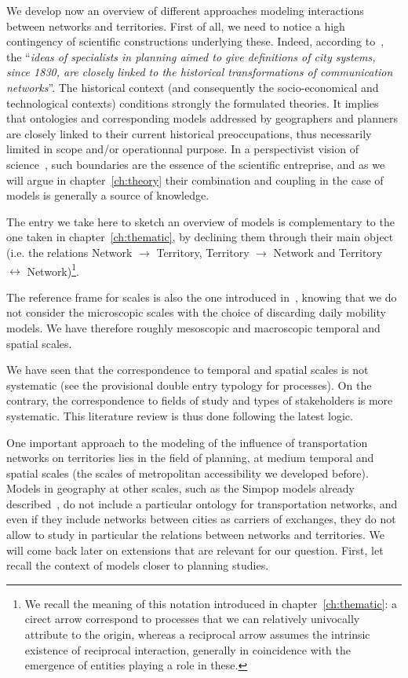 \documentclass[galley]{jtlu-article-2col}
\begin{document}
We develop now an overview of different approaches modeling interactions between networks and territories. First of all, we need to notice a high contingency of scientific constructions underlying these. Indeed, according to~\cite{bretagnolle2002time}, the ``\textit{ideas of specialists in planning aimed to give definitions of city systems, since 1830, are closely linked to the historical transformations of communication networks}''. The historical context (and consequently the socio-economical and technological contexts) conditions strongly the formulated theories. It implies that ontologies and corresponding models addressed by geographers and planners are closely linked to their current historical preoccupations, thus necessarily limited in scope and/or operationnal purpose. In a perspectivist vision of science~\cite{giere2010scientific}, such boundaries are the essence of the scientific entreprise, and as we will argue in chapter~\ref{ch:theory} their combination and coupling in the case of models is generally a source of knowledge.

The entry we take here to sketch an overview of models is complementary to the one taken in chapter~\ref{ch:thematic}, by declining them through their main object (i.e. the relations Network $\rightarrow$ Territory, Territory $\rightarrow$ Network and Territory $\leftrightarrow$ Network)\footnote{We recall the meaning of this notation introduced in chapter~\ref{ch:thematic}: a cirect arrow correspond to processes that we can relatively univocally attribute to the origin, whereas a reciprocal arrow assumes the intrinsic existence of reciprocal interaction, generally in coincidence with the emergence of entities playing a role in these.}.

The reference frame for scales is also the one introduced in~\cite{raimbault2018caracterisation}, knowing that we do not consider the microscopic scales with the choice of discarding daily mobility models. We have therefore roughly mesoscopic and macroscopic temporal and spatial scales.

We have seen that the correspondence to temporal and spatial scales is not systematic (see the provisional double entry typology for processes). On the contrary, the correspondence to fields of study and types of stakeholders is more systematic. This literature review is thus done following the latest logic.

One important approach to the modeling of the influence of transportation networks on territories lies in the field of planning, at medium temporal and spatial scales (the scales of metropolitan accessibility we developed before). Models in geography at other scales, such as the Simpop models already described~\cite{pumain2012multi}, do not include a particular ontology for transportation networks, and even if they include networks between cities as carriers of exchanges, they do not allow to study in particular the relations between networks and territories. We will come back later on extensions that are relevant for our question. First, let recall the context of models closer to planning studies.
\end{document}
